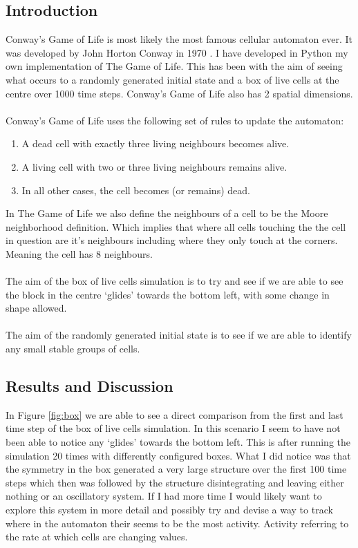 \documentclass{article}
\begin{document}
\subsection{Introduction}
Conway's Game of Life is most likely the most famous cellular automaton ever. It was developed by John Horton Conway in 1970 \cite{conway}. I have developed in Python my own implementation of The Game of Life. This has been with the aim of seeing what occurs to a randomly generated initial state and a box of live cells at the centre over 1000 time steps. Conway's Game of Life also has 2 spatial dimensions.\\
\\
Conway's Game of Life uses the following set of rules to update the automaton:
\begin{enumerate}
    \item A dead cell with exactly three living neighbours becomes alive.
    \item A living cell with two or three living neighbours remains alive.
    \item In all other cases, the cell becomes (or remains) dead.
\end{enumerate}
In The Game of Life we also define the neighbours of a cell to be the Moore neighborhood definition. Which implies that where all cells touching the the cell in question are it's neighbours including where they only touch at the corners. Meaning the cell has 8 neighbours.\\
\\
The aim of the box of live cells simulation is to try and see if we are able to see the block in the centre ‘glides’ towards the bottom left, with some change in shape allowed.\\
\\
The aim of the randomly generated initial state is to see if we are able to identify any small stable groups of cells.
\subsection{Results and Discussion}
In Figure \ref{fig:box} we are able to see a direct comparison from the first and last time step of the box of live cells simulation. In this scenario I seem to have not been able to notice any ‘glides’ towards the bottom left. This is after running the simulation 20 times with differently configured boxes. What I did notice was that the symmetry in the box generated a very large structure over the first 100 time steps which then was followed by the structure disintegrating and leaving either nothing or an oscillatory system. If I had more time I would likely want to explore this system in more detail and possibly try and devise a way to track where in the automaton their seems to be the most activity. Activity referring to the rate at which cells are changing values.
\end{document}
